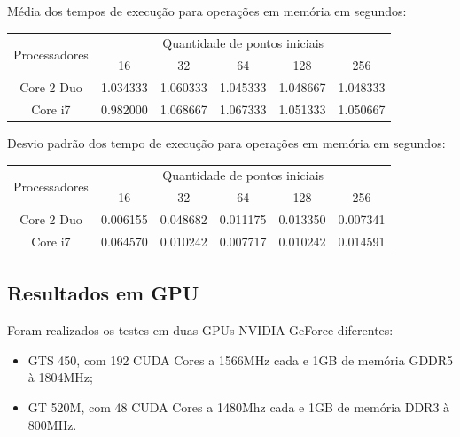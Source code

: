     \hspace{1mm}\newline
    
    \noindent Média dos tempos de execução para operações em memória em segundos:\\
    \begin{tabular}{| c | c | c | c | c | c |}
      \hline
      \multirow{2}{*}{Processadores}& \multicolumn{5}{|c|}{Quantidade de pontos iniciais} \\ \cline{2-6}
      & 16 & 32 & 64 & 128 & 256 \\ \hline
      Core 2 Duo & 1.034333 & 1.060333 & 1.045333 & 1.048667 & 1.048333 \\ \hline
      Core i7 & 0.982000 & 1.068667 & 1.067333 & 1.051333 & 1.050667\\ \hline

      \hline
    \end{tabular}
    
    \hspace{1mm}\newline
    
    \noindent Desvio padrão dos tempo de execução para operações em memória em segundos:\\
    \begin{tabular}{| c | c | c | c | c | c |}
      \hline
      \multirow{2}{*}{Processadores}& \multicolumn{5}{|c|}{Quantidade de pontos iniciais} \\ \cline{2-6}
      & 16 & 32 & 64 & 128 & 256 \\ \hline
      Core 2 Duo & 0.006155 & 0.048682 & 0.011175 & 0.013350 & 0.007341 \\ \hline
      Core i7 & 0.064570 & 0.010242 & 0.007717 & 0.010242 & 0.014591 \\ \hline

      \hline
    \end{tabular}

  \subsection{Resultados em GPU}
    Foram realizados os testes em duas GPUs NVIDIA GeForce diferentes:
  \begin{itemize}
    \item GTS 450, com 192 CUDA Cores a 1566MHz cada e 1GB de memória GDDR5 à 1804MHz;
    \item GT 520M, com 48 CUDA Cores a 1480Mhz cada e 1GB de memória DDR3 à 800MHz.
  \end{itemize}
  

